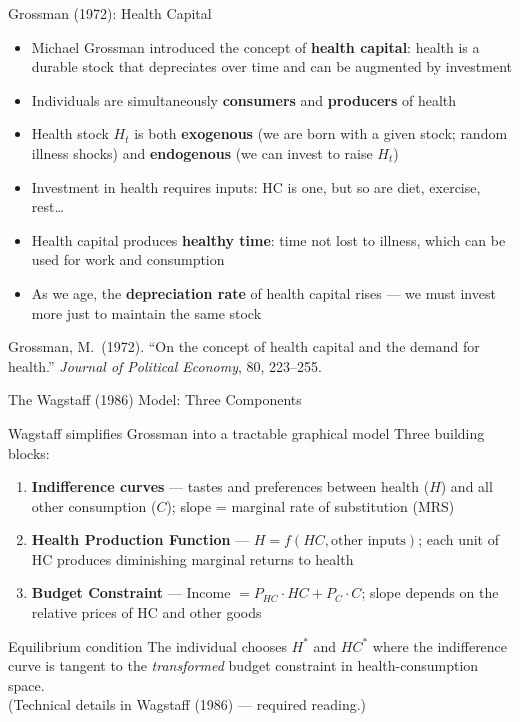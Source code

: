 \documentclass[aspectratio=169, 12pt]{beamer}
\begin{document}
\begin{frame}{Grossman (1972): Health Capital}
  \begin{itemize}
    \item Michael Grossman introduced the concept of \textbf{health capital}:
          health is a durable stock that depreciates over time and can be augmented by
          investment
    \item Individuals are simultaneously \textbf{consumers} and \textbf{producers} of health
    \item Health stock $H_t$ is both \textbf{exogenous} (we are born with a given stock;
          random illness shocks) and \textbf{endogenous} (we can invest to raise $H_t$)
    \item Investment in health requires inputs: HC is one, but so are diet, exercise, rest\ldots
    \item Health capital produces \textbf{healthy time}: time not lost to illness, which
          can be used for work and consumption
    \item As we age, the \textbf{depreciation rate} of health capital rises --- we must invest
          more just to maintain the same stock
  \end{itemize}
  \vspace{0.2em}
  {\footnotesize Grossman, M.\ (1972). ``On the concept of health capital and the demand for
  health.'' \textit{Journal of Political Economy}, 80, 223--255.}
\end{frame}

\begin{frame}{The Wagstaff (1986) Model: Three Components}
  \begin{block}{Wagstaff simplifies Grossman into a tractable graphical model}
    Three building blocks:
    \begin{enumerate}
      \item \textbf{Indifference curves} --- tastes and preferences between health ($H$) and
            all other consumption ($C$); slope = marginal rate of substitution (MRS)
      \item \textbf{Health Production Function} --- $H = f(HC, \text{other inputs})$;
            each unit of HC produces diminishing marginal returns to health
      \item \textbf{Budget Constraint} --- Income $= P_{HC} \cdot HC + P_C \cdot C$;
            slope depends on the relative prices of HC and other goods
    \end{enumerate}
  \end{block}
  \vspace{0.3em}
  \begin{alertblock}{Equilibrium condition}
    The individual chooses $H^*$ and $HC^*$ where the indifference curve is tangent to the
    \emph{transformed} budget constraint in health-consumption space.\\
    (Technical details in Wagstaff (1986) --- required reading.)
  \end{alertblock}
\end{frame}
\end{document}
